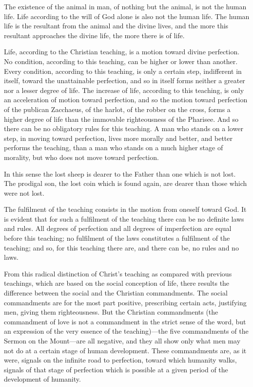 \documentclass{book}
\begin{document}
The existence of the animal in man, of nothing but the animal, is not the human life. Life according to the will of God alone is also not the human life. The human life is the resultant from the animal and the divine lives, and the more this resultant approaches the divine life, the more there is of life.

Life, according to the Christian teaching, is a motion toward divine perfection. No condition, according to this teaching, can be higher or lower than another. Every condition, according to this teaching, is only a certain step, indifferent in itself, toward the unattainable perfection, and so in itself forms neither a greater nor a lesser degree of life. The increase of life, according to this teaching, is only an acceleration of motion toward perfection, and so the motion toward perfection of the publican Zacchaeus, of the harlot, of the robber on the cross, forms a higher degree of life than the immovable righteousness of the Pharisee. And so there can be no obligatory rules for this teaching. A man who stands on a lower step, in moving toward perfection, lives more morally and better, and better performs the teaching, than a man who stands on a much higher stage of morality, but who does not move toward perfection.

In this sense the lost sheep is dearer to the Father than one which is not lost. The prodigal son, the lost coin which is found again, are dearer than those which were not lost.

The fulfilment of the teaching consists in the motion from oneself toward God. It is evident that for such a fulfilment of the teaching there can be no definite laws and rules. All degrees of perfection and all degrees of imperfection are equal before this teaching; no fulfilment of the laws constitutes a fulfilment of the teaching; and so, for this teaching there are, and there can be, no rules and no laws.

From this radical distinction of Christ’s teaching as compared with previous teachings, which are based on the social conception of life, there results the difference between the social and the Christian commandments. The social commandments are for the most part positive, prescribing certain acts, justifying men, giving them righteousness. But the Christian commandments (the commandment of love is not a commandment in the strict sense of the word, but an expression of the very essence of the teaching)—the five commandments of the Sermon on the Mount—are all negative, and they all show only what men may not do at a certain stage of human development. These commandments are, as it were, signals on the infinite road to perfection, toward which humanity walks, signals of that stage of perfection which is possible at a given period of the development of humanity.
\end{document}
